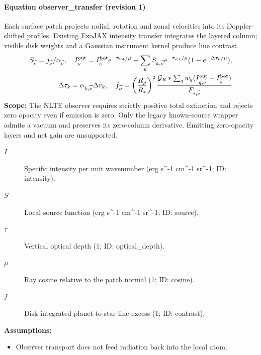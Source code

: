 \paragraph{Equation observer\_transfer (revision 1)}
Each surface patch projects radial, rotation and zonal velocities into its Doppler-shifted profiles. Existing ExoJAX intensity transfer integrates the layered column; visible disk weights and a Gaussian instrument kernel produce line contrast.
\begin{equation}
\begin{aligned}
S_{\widetilde\nu}=j_{\widetilde\nu}/\alpha_{\widetilde\nu},\quad I^{\rm out}_{\widetilde\nu}=I^{\rm bot}_{\widetilde\nu}e^{-\tau_{\rm tot}/\mu} +\sum_k S_{k,\widetilde\nu}e^{-\tau_{<k}/\mu}(1-e^{-\Delta\tau_k/\mu}),\\ \Delta\tau_k=\alpha_{k,\widetilde\nu}\Delta r_k,\quad f_{\widetilde\nu}=\left(\frac{R_p}{R_*}\right)^2 \frac{\mathcal G_R*\sum_q w_q(I^{\rm out}_{q,\widetilde\nu}-I^{\rm bot}_{\widetilde\nu})}{F_{*,\widetilde\nu}}
\end{aligned}
\label{eq:escape.nlte_5f_spectrum:observer_5f_transfer:1}
\end{equation}
\noindent\textbf{Scope:} The NLTE observer requires strictly positive total extinction and rejects zero opacity even if emission is zero. Only the legacy known-source wrapper admits a vacuum and preserves its zero-column derivative. Emitting zero-opacity layers and net gain are unsupported.

\begin{description}
\item[$I$] Specific intensity per unit wavenumber (erg s\textasciicircum{}-1 cm\textasciicircum{}-1 sr\textasciicircum{}-1; ID: intensity).
\item[$S$] Local source function (erg s\textasciicircum{}-1 cm\textasciicircum{}-1 sr\textasciicircum{}-1; ID: source).
\item[$\tau$] Vertical optical depth (1; ID: optical\_depth).
\item[$\mu$] Ray cosine relative to the patch normal (1; ID: cosine).
\item[$f$] Disk integrated planet-to-star line excess (1; ID: contrast).
\end{description}

\noindent\textbf{Assumptions:}
\begin{itemize}
\item Observer transport does not feed radiation back into the local atom.
\end{itemize}


